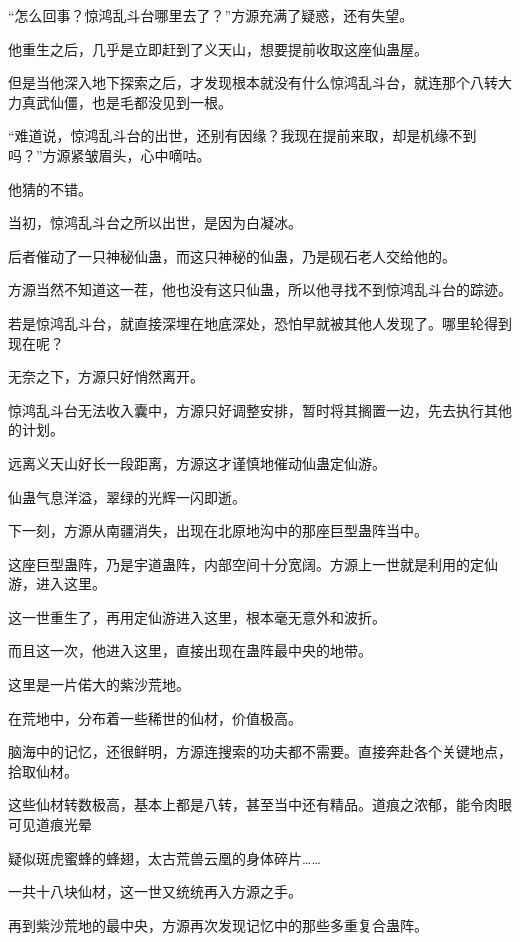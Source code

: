 
\begin{this_body}

“怎么回事？惊鸿乱斗台哪里去了？”方源充满了疑惑，还有失望。

他重生之后，几乎是立即赶到了义天山，想要提前收取这座仙蛊屋。

但是当他深入地下探索之后，才发现根本就没有什么惊鸿乱斗台，就连那个八转大力真武仙僵，也是毛都没见到一根。

“难道说，惊鸿乱斗台的出世，还别有因缘？我现在提前来取，却是机缘不到吗？”方源紧皱眉头，心中嘀咕。

他猜的不错。

当初，惊鸿乱斗台之所以出世，是因为白凝冰。

后者催动了一只神秘仙蛊，而这只神秘的仙蛊，乃是砚石老人交给他的。

方源当然不知道这一茬，他也没有这只仙蛊，所以他寻找不到惊鸿乱斗台的踪迹。

若是惊鸿乱斗台，就直接深埋在地底深处，恐怕早就被其他人发现了。哪里轮得到现在呢？

无奈之下，方源只好悄然离开。

惊鸿乱斗台无法收入囊中，方源只好调整安排，暂时将其搁置一边，先去执行其他的计划。

远离义天山好长一段距离，方源这才谨慎地催动仙蛊定仙游。

仙蛊气息洋溢，翠绿的光辉一闪即逝。

下一刻，方源从南疆消失，出现在北原地沟中的那座巨型蛊阵当中。

这座巨型蛊阵，乃是宇道蛊阵，内部空间十分宽阔。方源上一世就是利用的定仙游，进入这里。

这一世重生了，再用定仙游进入这里，根本毫无意外和波折。

而且这一次，他进入这里，直接出现在蛊阵最中央的地带。

这里是一片偌大的紫沙荒地。

在荒地中，分布着一些稀世的仙材，价值极高。

脑海中的记忆，还很鲜明，方源连搜索的功夫都不需要。直接奔赴各个关键地点，拾取仙材。

这些仙材转数极高，基本上都是八转，甚至当中还有精品。道痕之浓郁，能令肉眼可见道痕光晕

疑似斑虎蜜蜂的蜂翅，太古荒兽云凰的身体碎片……

一共十八块仙材，这一世又统统再入方源之手。

再到紫沙荒地的最中央，方源再次发现记忆中的那些多重复合蛊阵。


\end{this_body}
